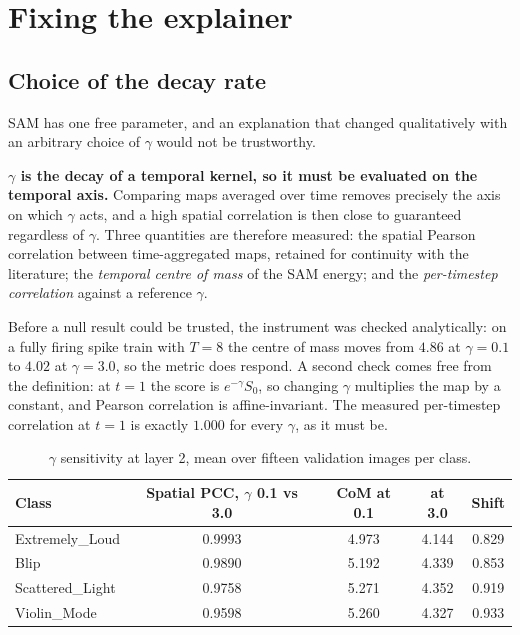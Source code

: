 \section{Fixing the explainer}

\subsection{Choice of the decay rate}

SAM has one free parameter, and an explanation that changed qualitatively with an
arbitrary choice of $\gamma$ would not be trustworthy.

\textbf{$\gamma$ is the decay of a temporal kernel, so it must be evaluated on
the temporal axis.} Comparing maps averaged over time removes precisely the axis
on which $\gamma$ acts, and a high spatial correlation is then close to
guaranteed regardless of $\gamma$. Three quantities are therefore measured: the
spatial Pearson correlation between time-aggregated maps, retained for continuity
with the literature; the \emph{temporal centre of mass} of the SAM energy; and
the \emph{per-timestep correlation} against a reference $\gamma$.

Before a null result could be trusted, the instrument was checked analytically:
on a fully firing spike train with $T = 8$ the centre of mass moves from $4.86$
at $\gamma = 0.1$ to $4.02$ at $\gamma = 3.0$, so the metric does respond. A
second check comes free from the definition: at $t = 1$ the score is
$e^{-\gamma} S_0$, so changing $\gamma$ multiplies the map by a constant, and
Pearson correlation is affine-invariant. The measured per-timestep correlation at
$t = 1$ is exactly $1.000$ for every $\gamma$, as it must be.

\begin{table}[htbp]
\centering
\begin{tabular}{lcccc}
\toprule
Class & Spatial PCC, $\gamma$ 0.1 vs 3.0 & CoM at 0.1 & at 3.0 & Shift \\
\midrule
Extremely\_Loud & 0.9993 & 4.973 & 4.144 & 0.829 \\
Blip & 0.9890 & 5.192 & 4.339 & 0.853 \\
Scattered\_Light & 0.9758 & 5.271 & 4.352 & 0.919 \\
Violin\_Mode & 0.9598 & 5.260 & 4.327 & 0.933 \\
\bottomrule
\end{tabular}
\caption{$\gamma$ sensitivity at layer 2, mean over fifteen validation images per
class.}
\label{tab:gamma}
\end{table}

